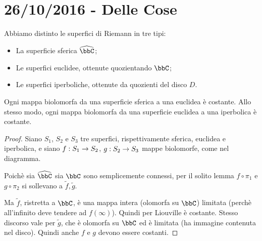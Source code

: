 \chapter{26/10/2016 - Delle Cose}
	Abbiamo distinto le superfici di Riemann in tre tipi:
	\begin{itemize}
	 \item La superficie sferica $\hat\bbC$;
	 \item Le superfici euclidee, ottenute quozientando $\bbC$;
	 \item Le superfici iperboliche, ottenute da quozienti del disco $D$.
	\end{itemize}

	\begin{proposizione}
		Ogni mappa biolomorfa da una superficie sferica a una euclidea è costante. Allo stesso modo, ogni mappa biolomorfa da una superficie euclidea a una iperbolica è costante.
	\end{proposizione}
	
	\begin{proof}
		Siano $S_1$, $S_2$ e $S_3$ tre superfici, rispettivamente sferica, euclidea e iperbolica, e siano $f: S_1 \rightarrow S_2$, $g: S_2 \rightarrow S_3$ mappe biolomorfe, come nel diagramma.
		
		
		Poichè sia $\hat\bbC$ sia $\bbC$ sono semplicemente connessi, per il solito lemma $f \circ \pi_1$ e $g \circ \pi_2$ si sollevano a $\tilde f, \tilde g$. 
		
		Ma $\tilde f$, ristretta a $\bbC$, è una mappa intera (olomorfa su $\bbC$) limitata (perchè all'infinito deve tendere ad $f(\infty)$). Quindi per Liouville è costante.
		Stesso discorso vale per $\tilde g$, che è olomorfa su $\bbC$ ed è limitata (ha immagine contenuta nel disco). Quindi anche $f$ e $g$ devono essere costanti.
		
		
	\end{proof}

